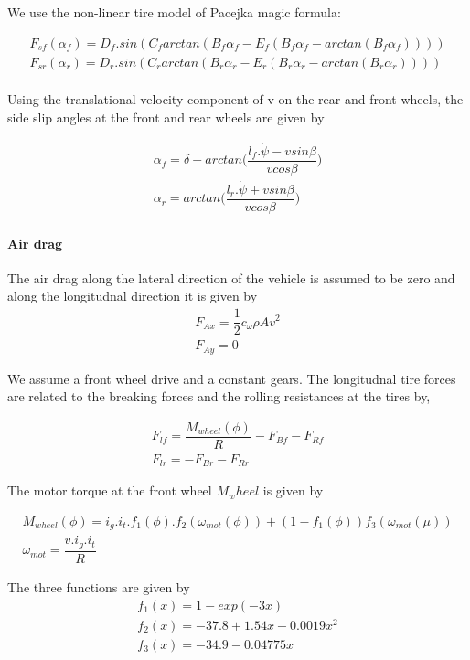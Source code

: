\documentclass{article}
\begin{document}
We use the non-linear tire model of Pacejka magic formula:

\begin{align}
    F_{sf}(\alpha_f) = D_f.sin(C_f arctan(B_f\alpha_f - E_f(B_f\alpha_f - arctan(B_f\alpha_f))))\\
     F_{sr}(\alpha_r) = D_r.sin(C_r arctan(B_r\alpha_r - E_r(B_r\alpha_r - arctan(B_r\alpha_r))))
\end{align}
\\

Using the translational velocity component of v on the rear and front wheels, the side slip angles at the front and rear wheels are given by

\begin{align}
    \alpha_f = \delta - arctan \bigg( \dfrac{l_f. \dot{\psi} - vsin\beta}{vcos\beta} \bigg)\\
     \alpha_r = arctan \bigg( \dfrac{l_r. \dot{\psi} + vsin\beta}{vcos\beta} \bigg)
\end{align}

\paragraph{Air drag}

The air drag along the lateral direction of the vehicle is assumed to be zero and along the longitudnal direction it is given by
\begin{align}
    F_{Ax} = \dfrac{1}{2} c_{\omega} \rho A v^2\\
    F_{Ay} = 0
\end{align}

We assume a front wheel drive and a constant gears.
The longitudnal tire forces are related to the breaking forces and the rolling resistances at the tires by,

\begin{align}
    F_{lf} = \dfrac{M_{wheel}(\phi)}{R} - F_{Bf} - F_{Rf}\\
    F_{lr} = -F_{Br} - F_{Rr}
\end{align}

The motor torque at the front wheel \(M_wheel\) is given by

\begin{align}
    M_{wheel}(\phi) = i_g. i_t. f_1(\phi). f_2(\omega_{mot}(\phi)) + (1-f_1(\phi))f_3(\omega_{mot}(\mu))\\
    \omega_{mot} = \dfrac{v.i_g.i_t}{R}
\end{align}

The three functions are given by 
\begin{align}
    f_1(x) = 1 - exp(-3x)\\
    f_2(x) = -37.8 + 1.54x-0.0019x^2\\
    f_3(x) = -34.9 - 0.04775x
\end{align}
\end{document}
